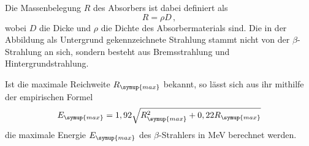 Die Massenbelegung $R$ des Absorbers ist dabei definiert als
\begin{equation}
  R=\rho D \,,
\end{equation}
wobei $D$ die Dicke und $\rho$ die Dichte des Absorbermaterials sind. Die in der Abbildung
als Untergrund gekennzeichnete Strahlung stammt nicht von der $\beta$-Strahlung an sich,
sondern besteht aus Bremsstrahlung und Hintergrundstrahlung.

Ist die maximale Reichweite $R_{\symup{max}}$ bekannt, so lässt sich aus ihr mithilfe
der empirischen Formel
\begin{equation}
  E_{\symup{max}}=1,92 \sqrt{R_{\symup{max}}^2+0,22 R_{\symup{max}}}
  \label{eqn:emax}
\end{equation}
die maximale Energie $E_{\symup{max}}$ des $\beta$-Strahlers in MeV berechnet werden.
